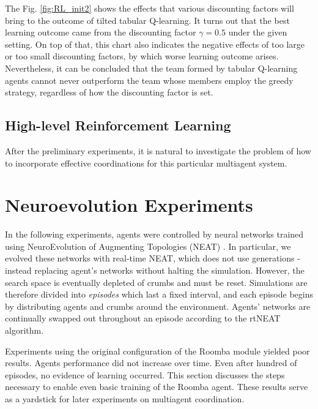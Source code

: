 \documentclass[conference]{IEEEtran}
\begin{document}
The Fig. \ref{fig:RL_init2} shows the effects that various discounting factors
will bring to the outcome of tilted tabular Q-learning. It turns out that the
best learning outcome came from the discounting factor $\gamma = 0.5$ under
the given setting. On top of that, this chart also indicates the negative
effects of too large or too small discounting factors, by which worse learning
outcome arises. Nevertheless, it can be concluded that the team formed by
tabular Q-learning agents cannot never outperform the team whose members
employ the greedy strategy, regardless of how the discounting factor is set.

\subsection{High-level Reinforcement Learning}
After the preliminary experiments, it is natural to investigate the problem of how
to incorporate effective coordinations for this particular multiagent system.



\section{Neuroevolution Experiments}
\label{section:neuro}

In the following experiments, agents were controlled by neural networks
trained using NeuroEvolution of Augmenting Topologies (NEAT) \cite{stanley2002evolving}.
In particular, we evolved these networks with real-time NEAT, which does not use generations - instead replacing agent's networks without halting the simulation. However, the search space is eventually depleted of crumbs and must be reset. Simulations are therefore divided into \textit{episodes} which last a fixed interval, and  each episode begins by distributing agents and crumbs around the environment. Agents' networks are continually swapped out throughout an episode according to the rtNEAT algorithm.

Experiments using the original configuration of the Roomba module yielded poor results. Agents performance did not increase over time.  Even after hundred of episodes, no evidence of learning occurred. This section discusses the steps necessary to enable even basic training of the Roomba agent. These results serve as a yardstick for later experiments on multiagent coordination.
\end{document}

